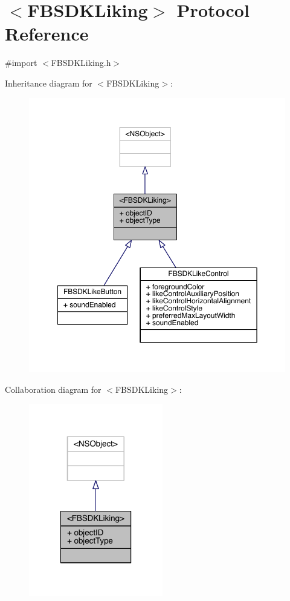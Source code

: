 \hypertarget{protocol_f_b_s_d_k_liking-p}{\section{$<$F\-B\-S\-D\-K\-Liking$>$ Protocol Reference}
\label{protocol_f_b_s_d_k_liking-p}
}


{\ttfamily \#import $<$F\-B\-S\-D\-K\-Liking.\-h$>$}



Inheritance diagram for $<$F\-B\-S\-D\-K\-Liking$>$\-:
\nopagebreak
\begin{figure}[H]
\begin{center}
\leavevmode
\includegraphics[width=350pt]{protocol_f_b_s_d_k_liking-p__inherit__graph}
\end{center}
\end{figure}


Collaboration diagram for $<$F\-B\-S\-D\-K\-Liking$>$\-:
\nopagebreak
\begin{figure}[H]
\begin{center}
\leavevmode
\includegraphics[width=166pt]{protocol_f_b_s_d_k_liking-p__coll__graph}
\end{center}
\end{figure}
